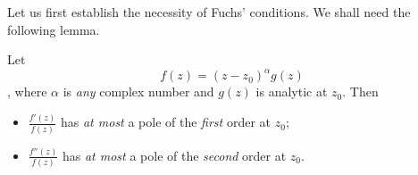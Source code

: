Let us first establish the necessity of Fuchs' conditions.
We shall need the following lemma.
\begin{lemma}\label{lemma:classA}
   Let 
   \begin{dmath}[label={classA}]
      f(z) = \left( z -z_{0} \right)^{\alpha} g (z) 
   \end{dmath},
   where $\alpha$ is \emph{any} complex number and $g(z)$ is analytic at $z_{0}$.
   Then 
   \begin{itemize}
      \item 
	 $\frac{f'(z)}{f(z)}$ has \emph{at most} a pole of the \emph{first} order at
	 $z_{0}$;
      \item $\frac{f''(z)}{f(z)}$ has \emph{at most} a pole of the
	 \emph{second}
	 order at $z_{0}$.
   \end{itemize}
\end{lemma}

